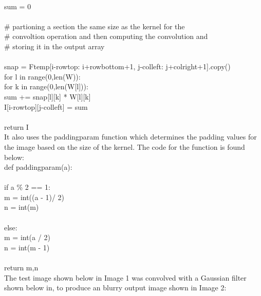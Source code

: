 \documentclass{article}
\begin{document}
	\\
	\indent \indent \indent sum = 0\\
	\\
	\indent \indent \indent \# partioning a section the same size as the kernel for the \\
	\indent \indent \indent \# convoltion operation and then computing the convolution and\\
	\indent \indent \indent \# storing it in the output array\\
	\\
	\indent \indent \indent snap = F\textunderscore temp[i-row\textunderscore top: i+row\textunderscore bottom+1, j-col\textunderscore left: j+col\textunderscore right+1].copy()\\
	\indent \indent \indent for l in range(0,len(W)):\\
	\indent \indent \indent \indent for k in range(0,len(W[l])):\\
	\indent \indent \indent \indent \indent sum += snap[l][k] * W[l][k]\\
	\indent \indent \indent I[i-row\textunderscore top][j-col\textunderscore left] = sum\\
	\\
	\indent return I\\
	
	It also uses the padding\textunderscore param function which determines the padding values for the image based on the size of the kernel. The code for the function is found below:\\
	
	\noindent def padding\textunderscore param(a):\\
	\\
	\indent if a \% 2 == 1: \\
	\indent \indent m = int((a - 1)/ 2)\\
	\indent \indent n = int(m)\\
	\\
	\indent else:\\
	\indent \indent	m = int(a / 2)\\
	\indent \indent n = int(m - 1)\\
	\\
	\indent return m,n\\
	
	The test image shown below in Image 1 was convolved with a Gaussian filter shown below in, to produce an blurry output image shown in Image 2:\\
	
\end{document}
